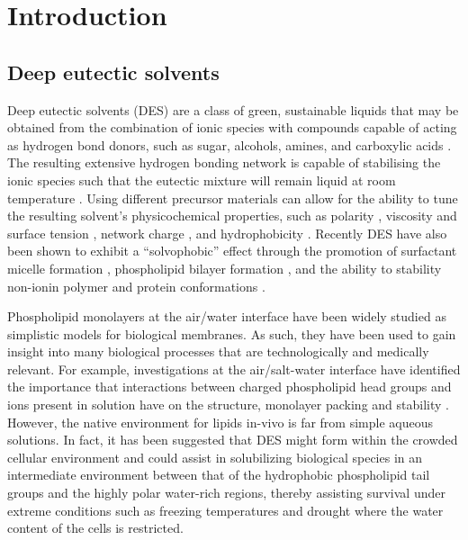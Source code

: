 \section{Introduction}
\label{sec:ref1intro}
\subsection{Deep eutectic solvents}
Deep eutectic solvents (DES) are a class of green, sustainable liquids that may be obtained from the combination of ionic species with compounds capable of acting as hydrogen bond donors, such as sugar, alcohols, amines, and carboxylic acids \cite{smith_deep_2014,dai_natural_2013}.
The resulting extensive hydrogen bonding network is capable of stabilising the ionic species such that the eutectic mixture will remain liquid at room temperature \cite{hammond_liquid_2016,hammond_resilience_2017,araujo_inelastic_2017}.
Using different precursor materials can allow for the ability to tune the resulting solvent's physicochemical properties, such as polarity \cite{pandey_how_2014}, viscosity and surface tension \cite{smith_deep_2014}, network charge \cite{zahn_charge_2016}, and hydrophobicity \cite{ribeiro_menthol-based_2015,van_osch_hydrophobic_2015}.
Recently DES have also been shown to exhibit a ``solvophobic'' effect through the promotion of surfactant micelle formation \cite{sanchez-fernandez_micellization_2016,arnold_surfactant_2015,hsieh_micelle_2018,banjare_self-assembly_2018}, phospholipid bilayer formation \cite{bryant_spontaneous_2016,bryant_effect_2017,gutierrez_freeze-drying_2009}, and the ability to stability non-ionin polymer \cite{sapir_properties_2016} and protein conformations \cite{sanchez-fernandez_protein_2017}.

Phospholipid monolayers at the air/water interface have been widely studied as simplistic models for biological membranes.
As such, they have been used to gain insight into many biological processes that are technologically and medically relevant.
For example, investigations at the air/salt-water interface have identified the importance that interactions between charged phospholipid head groups and ions present in solution have on the structure, monolayer packing and stability \cite{mohwald_phospholipid_1990,kewalramani_effects_2010}.
However, the native environment for lipids in-vivo is far from simple aqueous solutions.
In fact, it has been suggested \cite{dai_natural_2013,hammond_resilience_2017} that DES might form within the crowded cellular environment and could assist in solubilizing biological species in an intermediate environment between that of the hydrophobic phospholipid tail groups and the highly polar water-rich regions, thereby assisting survival under extreme conditions such as freezing temperatures and drought where the water content of the cells is restricted.

